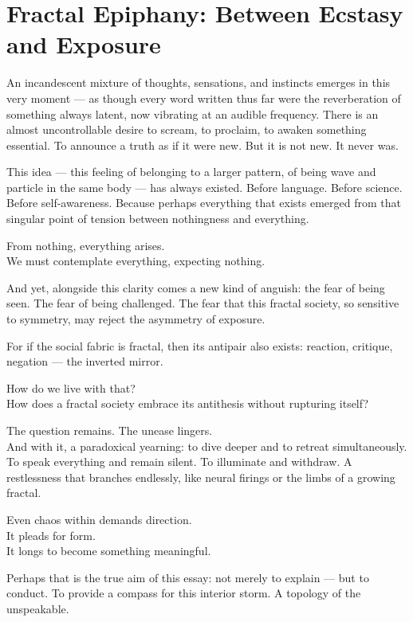 \section{Fractal Epiphany: Between Ecstasy and Exposure}

An incandescent mixture of thoughts, sensations, and instincts emerges in this very moment — as though every word written thus far were the reverberation of something always latent, now vibrating at an audible frequency. There is an almost uncontrollable desire to scream, to proclaim, to awaken something essential. To announce a truth as if it were new. But it is not new. It never was.

This idea — this feeling of belonging to a larger pattern, of being wave and particle in the same body — has always existed. Before language. Before science. Before self-awareness. Because perhaps everything that exists emerged from that singular point of tension between nothingness and everything.

From nothing, everything arises.\\
We must contemplate everything, expecting nothing.

And yet, alongside this clarity comes a new kind of anguish: the fear of being seen. The fear of being challenged. The fear that this fractal society, so sensitive to symmetry, may reject the asymmetry of exposure.

For if the social fabric is fractal, then its antipair also exists: reaction, critique, negation — the inverted mirror.

How do we live with that?\\
How does a fractal society embrace its antithesis without rupturing itself?

The question remains. The unease lingers.\\
And with it, a paradoxical yearning: to dive deeper and to retreat simultaneously. To speak everything and remain silent. To illuminate and withdraw. A restlessness that branches endlessly, like neural firings or the limbs of a growing fractal.

Even chaos within demands direction.\\
It pleads for form.\\
It longs to become something meaningful.

Perhaps that is the true aim of this essay: not merely to explain — but to conduct. To provide a compass for this interior storm. A topology of the unspeakable.
